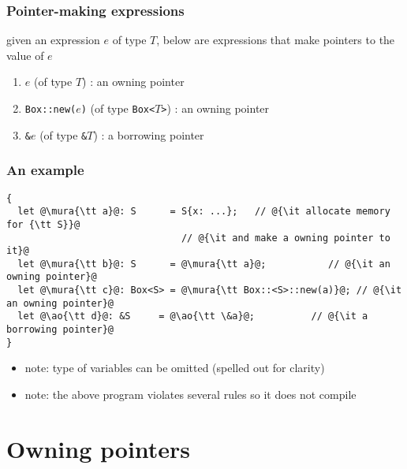 \documentclass[12pt,dvipdfmx]{beamer}
\newcommand{\mura}[1]{{\color{purple}#1}}
\newcommand{\ao}[1]{{\color{blue}#1}}
\begin{document}
\begin{frame}
  \frametitle{Pointer-making expressions}
  given an expression $e$ of type $T$, below are expressions that
  make pointers to the value of $e$
  \begin{enumerate}
  \item \mura{$e$} (of type \mura{$T$}) : an owning pointer
  \item \mura{\tt Box::new($e$)} (of type \mura{\tt Box<$T$>})
    : an owning pointer
  \item \ao{\tt \&$e$} (of type \ao{\tt \&$T$})
    : a borrowing pointer
  \end{enumerate}
\end{frame}

\begin{frame}[fragile]
  \frametitle{An example}
  \begin{lstlisting}
{
  let @\mura{\tt a}@: S      = S{x: ...};   // @{\it allocate memory for {\tt S}}@
                               // @{\it and make a owning pointer to it}@
  let @\mura{\tt b}@: S      = @\mura{\tt a}@;           // @{\it an owning pointer}@
  let @\mura{\tt c}@: Box<S> = @\mura{\tt Box::<S>::new(a)}@; // @{\it an owning pointer}@
  let @\ao{\tt d}@: &S     = @\ao{\tt \&a}@;          // @{\it a borrowing pointer}@
}
\end{lstlisting}

  
  \begin{itemize}
  \item note: type of variables can be omitted (spelled out for clarity)
  \item note: the above program violates several rules so it does not compile
  \end{itemize}
\end{frame}

\section{Owning pointers}
\end{document}
